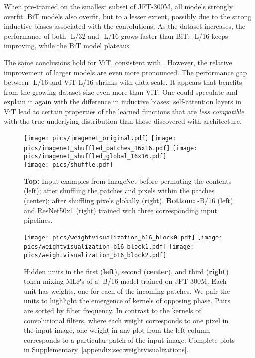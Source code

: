 When pre-trained on the smallest subset of JFT-300M, all \name{} models strongly overfit. 
BiT models also overfit, but to a lesser extent, possibly due to the strong inductive biases associated with the convolutions.
As the dataset increases, the performance of both \name{}-L/32 and \name{}-L/16 grows faster than BiT; \name{}-L/16 keeps improving, while the BiT model plateaus.

The same conclusions hold for ViT, consistent with \citet{Dosovitskiy2021}. However, the relative improvement of larger \name{} models are even more pronounced.
The performance gap between \name{}-L/16 and ViT-L/16 shrinks with data scale.
It appears that \name{} benefits from the growing
dataset size even more than ViT. 
One could speculate and explain it again with the difference in inductive biases:
self-attention layers in ViT lead to certain properties of the learned functions that are \emph{less compatible} with the true underlying distribution than those discovered with \name{} architecture.

\begin{figure}[tb]
\centering
\texttt{[image: pics/imagenet\_original.pdf]}
\texttt{[image: pics/imagenet\_shuffled\_patches\_16x16.pdf]}
\texttt{[image: pics/imagenet\_shuffled\_global\_16x16.pdf]}\vspace{.15cm}\\
\texttt{[image: pics/shuffle.pdf]}
\vspace{-.2cm}
\caption{
    {\bf Top:} 
    Input examples from ImageNet before permuting the contents (left);
    after shuffling the  patches and pixels within the patches (center);
    after shuffling pixels globally (right).
    {\bf Bottom:}  
    \name{}-B/16 (left) and ResNet50x1 (right) trained with three corresponding input pipelines.
}
\label{fig:input-pp-ablation}
\end{figure}

\begin{figure}[tb]
    \centering
    \texttt{[image: pics/weightvisualization\_b16\_block0.pdf]}
    \hspace{.1cm}
    \texttt{[image: pics/weightvisualization\_b16\_block1.pdf]}
    \hspace{.1cm}
    \texttt{[image: pics/weightvisualization\_b16\_block2.pdf]} 
    \caption{
     Hidden units in the first ({\bf left}), second ({\bf center}), and third ({\bf right}) token-mixing MLPs of a \name{}-B/16 model trained on JFT-300M.
     Each unit has  weights, one for each of the  incoming patches. 
     We pair the units to highlight the emergence of kernels of opposing phase.
     Pairs are sorted 
     by filter frequency.
     In contrast to the kernels of convolutional filters, where each weight corresponds to one pixel in the input image, one weight in any plot from the left column corresponds to a particular  patch of the input image. 
     Complete plots in Supplementary~\ref{appendix:sec:weightvisualizations}.
    }
  \label{fig:weight-plots}
  \vspace{-.4cm}
\end{figure}

